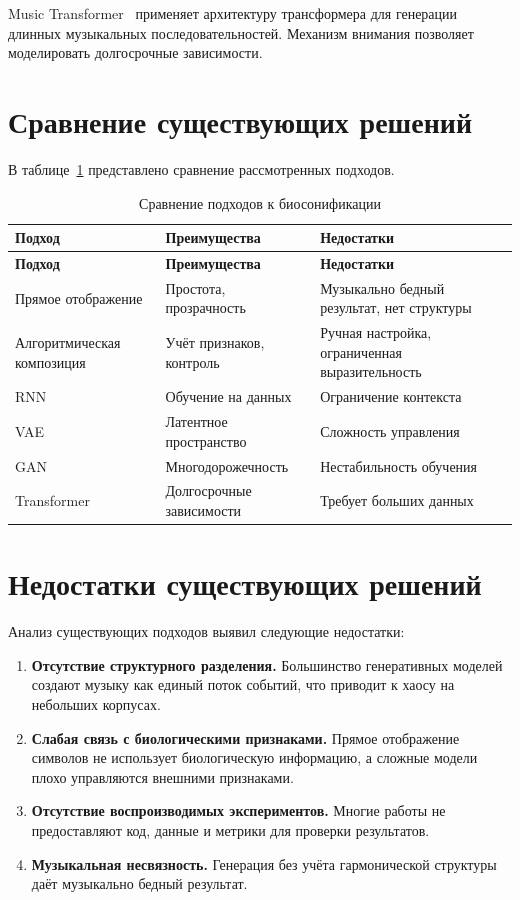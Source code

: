 Music Transformer~\cite{huang2018} применяет архитектуру трансформера для генерации длинных музыкальных последовательностей. Механизм внимания позволяет моделировать долгосрочные зависимости.

\section{Сравнение существующих решений}

В таблице~\ref{tab:solutions} представлено сравнение рассмотренных подходов.

\begin{longtable}{|p{}|p{}|p{}|}
\caption{Сравнение подходов к биосонификации}
\label{tab:solutions}\\
\hline
\textbf{Подход} & \textbf{Преимущества} & \textbf{Недостатки} \\
\hline
\endfirsthead
\hline
\textbf{Подход} & \textbf{Преимущества} & \textbf{Недостатки} \\
\hline
\endhead
\hline
\endfoot
Прямое отображение & Простота, прозрачность & Музыкально бедный результат, нет структуры \\
\hline
Алгоритмическая композиция & Учёт признаков, контроль & Ручная настройка, ограниченная выразительность \\
\hline
RNN & Обучение на данных & Ограничение контекста \\
\hline
VAE & Латентное пространство & Сложность управления \\
\hline
GAN & Многодорожечность & Нестабильность обучения \\
\hline
Transformer & Долгосрочные зависимости & Требует больших данных \\
\hline
\end{longtable}

\section{Недостатки существующих решений}

Анализ существующих подходов выявил следующие недостатки:

\begin{enumerate}
\item \textbf{Отсутствие структурного разделения.} Большинство генеративных моделей создают музыку как единый поток событий, что приводит к хаосу на небольших корпусах.

\item \textbf{Слабая связь с биологическими признаками.} Прямое отображение символов не использует биологическую информацию, а сложные модели плохо управляются внешними признаками.

\item \textbf{Отсутствие воспроизводимых экспериментов.} Многие работы не предоставляют код, данные и метрики для проверки результатов.

\item \textbf{Музыкальная несвязность.} Генерация без учёта гармонической структуры даёт музыкально бедный результат.
\end{enumerate}

